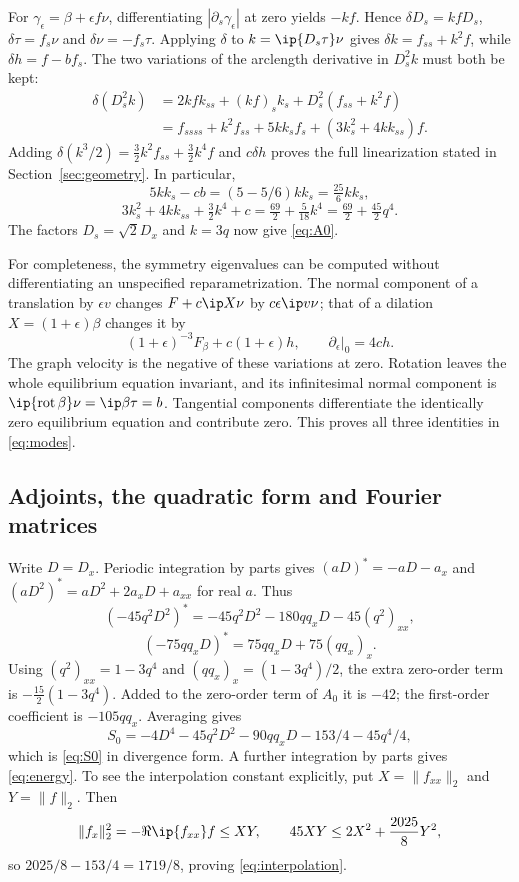 For $\gamma_\epsilon=\beta+\epsilon f\nu$, differentiating
$|\partial_s\gamma_\epsilon|$ at zero yields $-kf$.
Hence $\delta D_s=kfD_s$, $\delta\tau=f_s\nu$ and
$\delta\nu=-f_s\tau$. Applying $\delta$ to $k=\ip{D_s\tau}\nu$
gives $\delta k=f_{ss}+k^2f$, while
$\delta h=f-bf_s$. The two variations of the arclength derivative in
$D_s^2k$ must both be kept:
\begin{align}
 \delta(D_s^2k)
 &=2kf k_{ss}+(kf)_sk_s+D_s^2(f_{ss}+k^2f)\nonumber\\
 &=f_{ssss}+k^2f_{ss}+5kk_sf_s
      +(3k_s^2+4kk_{ss})f.\label{eq:variation-expanded}
\end{align}
Adding $\delta(k^3/2)=\tfrac32 k^2f_{ss}+\tfrac32 k^4f$
and $c\delta h$ proves the full linearization stated in
Section~\ref{sec:geometry}. In particular,
\[
 5kk_s-cb=(5-5/6)kk_s=\tfrac{25}{6}kk_s,
\]
\[
 3k_s^2+4kk_{ss}+\tfrac32k^4+c
 =\tfrac{69}{2}+\tfrac5{18}k^4
 =\tfrac{69}{2}+\tfrac{45}{2}q^4.
\]
The factors $D_s=\sqrt2D_x$ and $k=3q$ now give \eqref{eq:A0}.

For completeness, the symmetry eigenvalues can be computed without
differentiating an unspecified reparametrization. The normal component of a
translation by $\epsilon v$ changes $F+c\ip X\nu$ by
$c\epsilon\ip v\nu$; that of a dilation $X=(1+\epsilon)\beta$
changes it by
\[
 (1+\epsilon)^{-3}F_\beta+c(1+\epsilon)h,
 \qquad \partial_\epsilon|_0=4ch.
\]
The graph velocity is the negative of these variations at zero. Rotation
leaves the whole equilibrium equation invariant, and its infinitesimal normal
component is $\ip{\operatorname{rot}\beta}\nu=\ip\beta\tau=b$.
Tangential components differentiate the identically zero equilibrium equation
and contribute zero. This proves all three identities in \eqref{eq:modes}.

\subsection{Adjoints, the quadratic form and Fourier matrices}
Write $D=D_x$. Periodic integration by parts gives
$(aD)^*=-aD-a_x$ and $(aD^2)^*=aD^2+2a_xD+a_{xx}$ for real $a$.
Thus
\[
 (-45q^2D^2)^*=-45q^2D^2-180qq_xD-45(q^2)_{xx},
\]
\[
 (-75qq_xD)^*=75qq_xD+75(qq_x)_x.
\]
Using $(q^2)_{xx}=1-3q^4$ and
$(qq_x)_x=(1-3q^4)/2$, the extra zero-order term is
$-\tfrac{15}{2}(1-3q^4)$. Added to the zero-order term of $A_0$
it is $-42$; the first-order coefficient is $-105qq_x$.
Averaging gives
\[
 S_0=-4D^4-45q^2D^2-90qq_xD-153/4-45q^4/4,
\]
which is \eqref{eq:S0} in divergence form. A further integration by parts
gives \eqref{eq:energy}. To see the interpolation constant explicitly, put
$X=\|f_{xx}\|_2$ and $Y=\|f\|_2$. Then
\[
 \|f_x\|_2^2=-\Re\ip{f_{xx}}f\le XY,
 \qquad 45XY\le2X^2+\frac{2025}{8}Y^2,
\]
so $2025/8-153/4=1719/8$, proving \eqref{eq:interpolation}.

